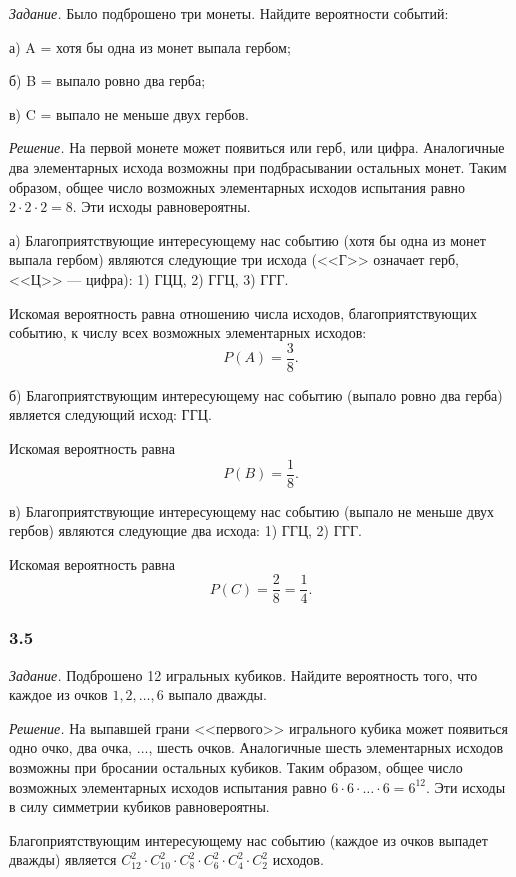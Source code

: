 \documentclass{book}
\begin{document}
\textit{Задание.} Было подброшено три монеты.
Найдите вероятности событий:

а) A = {хотя бы одна из монет выпала гербом};

б) B = {выпало ровно два герба};

в) C = {выпало не меньше двух гербов}.

\textit{Решение.} На первой монете может появиться или герб, или цифра.
Аналогичные два элементарных исхода возможны при подбрасывании остальных монет.
Таким образом, общее число возможных элементарных исходов испытания равно $2 \cdot 2 \cdot 2 = 8$.
Эти исходы равновероятны.

а) Благоприятствующие интересующему нас событию
(хотя бы одна из монет выпала гербом)
являются следующие три исхода (<<Г>> означает герб, <<Ц>> --- цифра): 1) ГЦЦ, 2) ГГЦ, 3) ГГГ.

Искомая вероятность равна отношению числа исходов, благоприятствующих событию, к числу всех возможных элементарных исходов:
$$P \left( A \right) =
\frac{3}{8}.$$

б) Благоприятствующим интересующему нас событию (выпало ровно два герба) является следующий исход: ГГЦ.

Искомая вероятность равна
$$P \left( B \right) =
\frac{1}{8}.$$

в) Благоприятствующие интересующему нас событию (выпало не меньше двух гербов) являются следующие два исхода: 1) ГГЦ, 2) ГГГ.

Искомая вероятность равна
$$P \left( C \right) =
\frac{2}{8} =
\frac{1}{4}.$$

\subsubsection*{3.5}

\textit{Задание.} Подброшено 12 игральных кубиков.
Найдите вероятность того, что каждое из очков $1, 2, \dotsc, 6$ выпало дважды.

\textit{Решение.}
На выпавшей грани <<первого>> игрального кубика может появиться одно очко, два очка, $ \dotsc $, шесть очков.
Аналогичные шесть элементарных исходов возможны при бросании остальных кубиков.
Таким образом, общее число возможных элементарных исходов испытания равно $6 \cdot 6 \cdot \dotsc \cdot 6 = 6^{12}$.
Эти исходы в силу симметрии кубиков равновероятны.

Благоприятствующим интересующему нас событию
(каждое из очков выпадет дважды)
является $C_{12}^2 \cdot C_{10}^2 \cdot C_8^2 \cdot C_6^2 \cdot C_4^2 \cdot C_2^2$ исходов.
\end{document}
